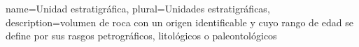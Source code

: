 \makeglossaries

{
	name=Unidad estratigráfica,
	plural=Unidades estratigráficas,
	description={volumen de roca con un origen identificable y cuyo rango de edad se define por sus rasgos petrográficos, litológicos o paleontológicos}
}

\glsaddall
